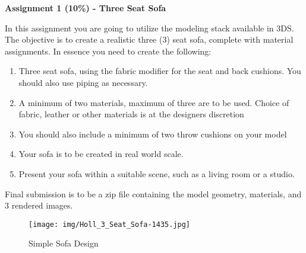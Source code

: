 
	
\begin{flushleft}
\Large\textbf{Assignment 1 (10\%) - Three Seat Sofa }\\
\end{flushleft}

In this assignment you are going to utilize the modeling stack available in 3DS.  The objective is to create a realistic three (3) seat sofa, complete with material assignments.  In essence you need to create the following:
\begin{enumerate}
	\item Three seat sofa, using the fabric modifier for the seat and back cushions.  You should also use piping as necessary.
	\item A minimum of two materials, maximum of three are to be used.  Choice of fabric, leather or other materials is at the designers discretion
	\item You should also include a minimum of two throw cushions on your model
	\item Your sofa is to be created in real world scale.
	\item Present your sofa within a suitable scene, such as a living room or a studio.
\end{enumerate}

Final submission is to be a zip file containing the model geometry, materials, and 3 rendered images.\\


\vspace{1cm}

\begin{figure}[hb]
	\centering
		\texttt{[image: img/Holl\_3\_Seat\_Sofa-1435.jpg]}
		\caption{Simple Sofa Design}
	\label{fig:Holl_3_Seat_Sofa-1435}
\end{figure}




 

